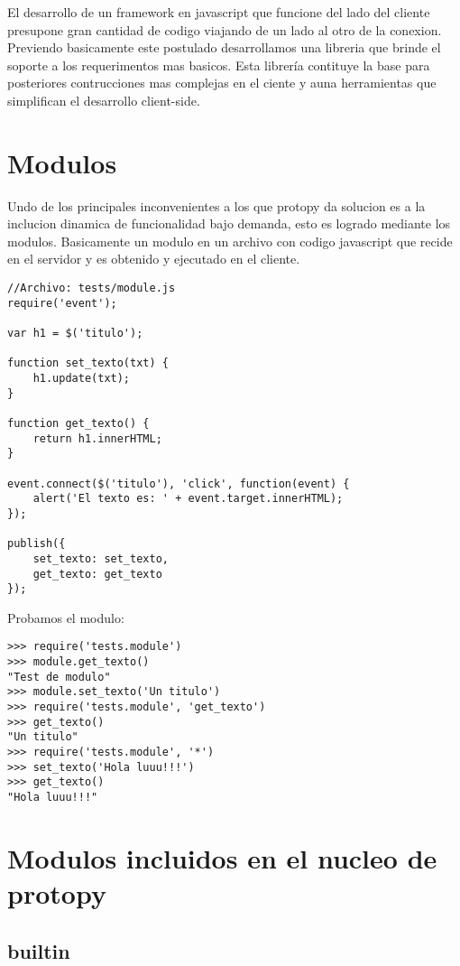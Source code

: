 El desarrollo de un framework en javascript que funcione del lado del cliente presupone gran cantidad de codigo
viajando de un lado al otro de la conexion. Previendo basicamente este postulado desarrollamos una libreria
que brinde el soporte a los requerimentos mas basicos.
Esta librería contituye la base para posteriores contrucciones mas complejas en el ciente y auna herramientas
que simplifican el desarrollo client-side.

\section{Modulos}
Undo de los principales inconvenientes a los que protopy da solucion es a la inclucion dinamica de funcionalidad bajo demanda,
esto es logrado mediante los modulos.
Basicamente un modulo en un archivo con codigo javascript que recide en el servidor y es obtenido y ejecutado en el cliente.

\begin{lstlisting}[style=javascript,label=estructura-modulo,caption=Estructura de un modulo]
//Archivo: tests/module.js
require('event');

var h1 = $('titulo');

function set_texto(txt) {
    h1.update(txt);
}

function get_texto() {
    return h1.innerHTML;
}

event.connect($('titulo'), 'click', function(event) {
    alert('El texto es: ' + event.target.innerHTML);
});

publish({
    set_texto: set_texto,
    get_texto: get_texto
});
\end{lstlisting}

\noindent
Probamos el modulo:
\begin{lstlisting}[style=consola]
>>> require('tests.module')
>>> module.get_texto()
"Test de modulo"
>>> module.set_texto('Un titulo')
>>> require('tests.module', 'get_texto')
>>> get_texto()
"Un titulo"
>>> require('tests.module', '*')
>>> set_texto('Hola luuu!!!')
>>> get_texto()
"Hola luuu!!!"
\end{lstlisting}

\section{Modulos incluidos en el nucleo de protopy}
\subsection{builtin}

